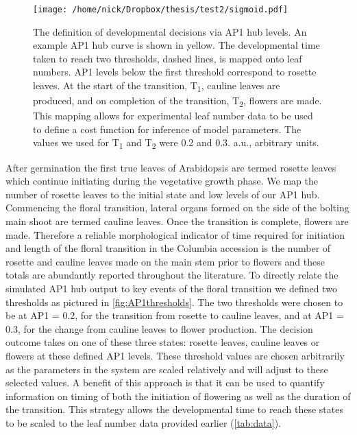 \begin{figure*}[!htbp]
\centering
\texttt{[image: /home/nick/Dropbox/thesis/test2/sigmoid.pdf]}
\caption{The definition of developmental decisions via AP1 hub levels.
An example AP1 hub curve is shown in yellow.
The developmental time taken to reach two thresholds, dashed lines, is mapped onto leaf numbers.
AP1 levels below the first threshold correspond to rosette leaves.
At the start of the transition, T\textsubscript{1}, cauline leaves are produced, and on completion of the transition, T\textsubscript{2}, flowers are made.
This mapping allows for experimental leaf number data to be used to define a cost function for inference of model parameters.
The values we used for T\textsubscript{1} and T\textsubscript{2} were 0.2 and 0.3.
a.u., arbitrary units.}
\label{fig:AP1thresholds}
\end{figure*}
After germination the first true leaves of Arabidopsis are termed rosette leaves which continue initiating during the vegetative growth phase.
We map the number of rosette leaves to the initial state and low levels of our AP1 hub.
Commencing the floral transition, lateral organs formed on the side of the bolting main shoot are termed cauline leaves.
Once the transition is complete, flowers are made.
Therefore a reliable morphological indicator of time required for initiation and length of the floral transition in the Columbia accession is the number of rosette and cauline leaves made on the main stem prior to flowers and these totals are abundantly reported throughout the literature.
To directly relate the simulated AP1 hub output to key events of the floral transition we defined two thresholds as pictured in \autoref{fig:AP1thresholds}.
The two thresholds were chosen to be at AP1 = 0.2, for the transition from rosette to cauline leaves, and at AP1 = 0.3, for the change from cauline leaves to flower production.
The decision outcome takes on one of these three states: rosette leaves, cauline leaves or flowers at these defined AP1 levels.
These threshold values are chosen arbitrarily as the parameters in the system are scaled relatively and will adjust to these selected values.
A benefit of this approach is that it can be used to quantify information on timing of both the initiation of flowering as well as the duration of the transition.
This strategy allows the developmental time to reach these states to be scaled to the leaf number data provided earlier (\autoref{tab:data}).

